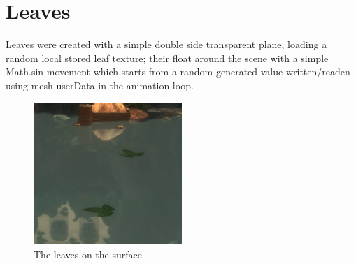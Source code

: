\documentclass[10pt,a4paper]{article}
\begin{document}
\section{Leaves}

Leaves were created with a simple double side transparent plane, loading a random local stored leaf texture; their float around the scene with a simple Math.sin movement which starts from a random generated value written/readen using mesh userData in the animation loop.

\begin{figure}[H]
  \includegraphics[width=0.5\textwidth]{leaves}
     \caption{The leaves on the surface}
\end{figure}
\end{document}
